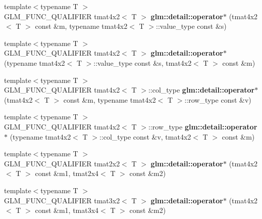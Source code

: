 \begin{DoxyCompactItemize}
\item 
\hypertarget{namespaceglm_1_1detail_a3742be653e7749b1f5d08b2f1879b8dd}{}{\footnotesize template$<$typename T $>$ }\\G\+L\+M\+\_\+\+F\+U\+N\+C\+\_\+\+Q\+U\+A\+L\+I\+F\+I\+E\+R tmat4x2$<$ T $>$ {\bfseries glm\+::detail\+::operator$\ast$} (tmat4x2$<$ T $>$ const \&m, typename tmat4x2$<$ T $>$\+::value\+\_\+type const \&s)\label{namespaceglm_1_1detail_a3742be653e7749b1f5d08b2f1879b8dd}

\item 
\hypertarget{namespaceglm_1_1detail_a01d02f917269ffad54065719f9700d95}{}{\footnotesize template$<$typename T $>$ }\\G\+L\+M\+\_\+\+F\+U\+N\+C\+\_\+\+Q\+U\+A\+L\+I\+F\+I\+E\+R tmat4x2$<$ T $>$ {\bfseries glm\+::detail\+::operator$\ast$} (typename tmat4x2$<$ T $>$\+::value\+\_\+type const \&s, tmat4x2$<$ T $>$ const \&m)\label{namespaceglm_1_1detail_a01d02f917269ffad54065719f9700d95}

\item 
\hypertarget{namespaceglm_1_1detail_a29df121e911684240418a98e1c30a6d6}{}{\footnotesize template$<$typename T $>$ }\\G\+L\+M\+\_\+\+F\+U\+N\+C\+\_\+\+Q\+U\+A\+L\+I\+F\+I\+E\+R tmat4x2$<$ T $>$\+::col\+\_\+type {\bfseries glm\+::detail\+::operator$\ast$} (tmat4x2$<$ T $>$ const \&m, typename tmat4x2$<$ T $>$\+::row\+\_\+type const \&v)\label{namespaceglm_1_1detail_a29df121e911684240418a98e1c30a6d6}

\item 
\hypertarget{namespaceglm_1_1detail_af89ed1ea58615ec1954e041e1d8d498f}{}{\footnotesize template$<$typename T $>$ }\\G\+L\+M\+\_\+\+F\+U\+N\+C\+\_\+\+Q\+U\+A\+L\+I\+F\+I\+E\+R tmat4x2$<$ T $>$\+::row\+\_\+type {\bfseries glm\+::detail\+::operator$\ast$} (typename tmat4x2$<$ T $>$\+::col\+\_\+type const \&v, tmat4x2$<$ T $>$ const \&m)\label{namespaceglm_1_1detail_af89ed1ea58615ec1954e041e1d8d498f}

\item 
\hypertarget{namespaceglm_1_1detail_aba7326ac44c2bb0c27924148035726ab}{}{\footnotesize template$<$typename T $>$ }\\G\+L\+M\+\_\+\+F\+U\+N\+C\+\_\+\+Q\+U\+A\+L\+I\+F\+I\+E\+R tmat2x2$<$ T $>$ {\bfseries glm\+::detail\+::operator$\ast$} (tmat4x2$<$ T $>$ const \&m1, tmat2x4$<$ T $>$ const \&m2)\label{namespaceglm_1_1detail_aba7326ac44c2bb0c27924148035726ab}

\item 
\hypertarget{namespaceglm_1_1detail_a4950549c5977807343274daea35e5dba}{}{\footnotesize template$<$typename T $>$ }\\G\+L\+M\+\_\+\+F\+U\+N\+C\+\_\+\+Q\+U\+A\+L\+I\+F\+I\+E\+R tmat3x2$<$ T $>$ {\bfseries glm\+::detail\+::operator$\ast$} (tmat4x2$<$ T $>$ const \&m1, tmat3x4$<$ T $>$ const \&m2)\label{namespaceglm_1_1detail_a4950549c5977807343274daea35e5dba}


\end{DoxyCompactItemize}
